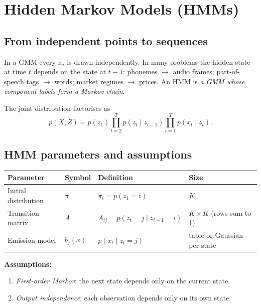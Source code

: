\documentclass[11pt,a4paper]{article}
\begin{document}
\section{Hidden Markov Models (HMMs)}

\subsection{From independent points to sequences}

In a GMM every $z_n$ is drawn independently. In many problems the hidden state at time $t$ depends on the state at $t-1$:
phonemes $\to$ audio frames; part-of-speech tags $\to$ words; market regimes $\to$ prices.
An HMM is \emph{a GMM whose component labels form a Markov chain}.

\begin{center}
\end{center}

The joint distribution factorises as
\[
p(X,Z)=p(z_1)\prod_{t=2}^T p(z_t\mid z_{t-1})\prod_{t=1}^T p(x_t\mid z_t).
\]

\subsection{HMM parameters and assumptions}

\begin{center}
\begin{tabular}{@{}llll@{}}
\toprule
Parameter & Symbol & Definition & Size\\
\midrule
Initial distribution & $\pi$ & $\pi_i=p(z_1=i)$ & $K$\\
Transition matrix & $A$ & $A_{ij}=p(z_t=j\mid z_{t-1}=i)$ & $K\times K$ (rows sum to 1)\\
Emission model & $b_j(x)$ & $p(x_t\mid z_t=j)$ & table or Gaussian per state\\
\bottomrule
\end{tabular}
\end{center}
\textbf{Assumptions:}
\begin{enumerate}[nosep]
\item \emph{First-order Markov}: the next state depends only on the current state.
\item \emph{Output independence}: each observation depends only on its own state.
\end{enumerate}
\end{document}
